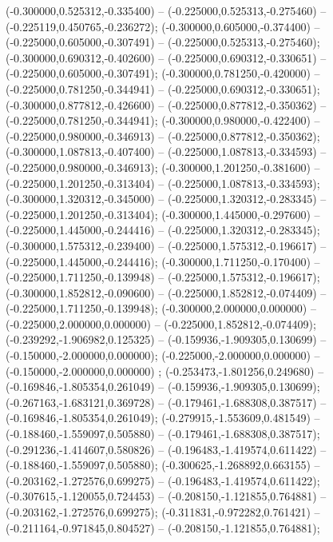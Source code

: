  (-0.300000,0.525312,-0.335400) -- (-0.225000,0.525313,-0.275460) -- (-0.225119,0.450765,-0.236272);
 (-0.300000,0.605000,-0.374400) -- (-0.225000,0.605000,-0.307491) -- (-0.225000,0.525313,-0.275460);
 (-0.300000,0.690312,-0.402600) -- (-0.225000,0.690312,-0.330651) -- (-0.225000,0.605000,-0.307491);
 (-0.300000,0.781250,-0.420000) -- (-0.225000,0.781250,-0.344941) -- (-0.225000,0.690312,-0.330651);
 (-0.300000,0.877812,-0.426600) -- (-0.225000,0.877812,-0.350362) -- (-0.225000,0.781250,-0.344941);
 (-0.300000,0.980000,-0.422400) -- (-0.225000,0.980000,-0.346913) -- (-0.225000,0.877812,-0.350362);
 (-0.300000,1.087813,-0.407400) -- (-0.225000,1.087813,-0.334593) -- (-0.225000,0.980000,-0.346913);
 (-0.300000,1.201250,-0.381600) -- (-0.225000,1.201250,-0.313404) -- (-0.225000,1.087813,-0.334593);
 (-0.300000,1.320312,-0.345000) -- (-0.225000,1.320312,-0.283345) -- (-0.225000,1.201250,-0.313404);
 (-0.300000,1.445000,-0.297600) -- (-0.225000,1.445000,-0.244416) -- (-0.225000,1.320312,-0.283345);
 (-0.300000,1.575312,-0.239400) -- (-0.225000,1.575312,-0.196617) -- (-0.225000,1.445000,-0.244416);
 (-0.300000,1.711250,-0.170400) -- (-0.225000,1.711250,-0.139948) -- (-0.225000,1.575312,-0.196617);
 (-0.300000,1.852812,-0.090600) -- (-0.225000,1.852812,-0.074409) -- (-0.225000,1.711250,-0.139948);
 (-0.300000,2.000000,0.000000) -- (-0.225000,2.000000,0.000000) -- (-0.225000,1.852812,-0.074409);
 (-0.239292,-1.906982,0.125325) -- (-0.159936,-1.909305,0.130699) -- (-0.150000,-2.000000,0.000000);
 (-0.225000,-2.000000,0.000000) -- (-0.150000,-2.000000,0.000000) ;
 (-0.253473,-1.801256,0.249680) -- (-0.169846,-1.805354,0.261049) -- (-0.159936,-1.909305,0.130699);
 (-0.267163,-1.683121,0.369728) -- (-0.179461,-1.688308,0.387517) -- (-0.169846,-1.805354,0.261049);
 (-0.279915,-1.553609,0.481549) -- (-0.188460,-1.559097,0.505880) -- (-0.179461,-1.688308,0.387517);
 (-0.291236,-1.414607,0.580826) -- (-0.196483,-1.419574,0.611422) -- (-0.188460,-1.559097,0.505880);
 (-0.300625,-1.268892,0.663155) -- (-0.203162,-1.272576,0.699275) -- (-0.196483,-1.419574,0.611422);
 (-0.307615,-1.120055,0.724453) -- (-0.208150,-1.121855,0.764881) -- (-0.203162,-1.272576,0.699275);
 (-0.311831,-0.972282,0.761421) -- (-0.211164,-0.971845,0.804527) -- (-0.208150,-1.121855,0.764881);

